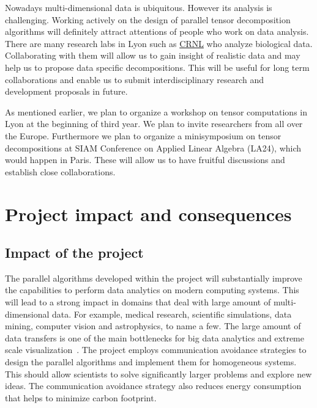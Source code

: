 \documentclass[a4paper,11pt]{article}
\begin{document}
	
	
	Nowadays multi-dimensional data is ubiquitous. However its analysis is challenging. Working actively on the design of parallel tensor decomposition algorithms will definitely attract attentions of people who work on data analysis. There are many research labs in Lyon such as \href{https://www.crnl.fr/}{CRNL} who analyze biological data. Collaborating with them will allow us to gain insight of realistic data and may help us to propose data specific decompositions. This will be useful for long term collaborations and enable us to submit interdisciplinary research and development proposals in future.
	
	As mentioned earlier, we plan to organize a workshop on tensor computations in Lyon at the beginning of third year. We plan to invite researchers from all over the Europe. Furthermore we plan to organize a minisymposium on tensor decompositions at SIAM Conference on Applied Linear Algebra (LA24), which would happen in Paris. These will allow us to have fruitful discussions and establish close collaborations.
	
	
	\section{Project impact and consequences}
	\label{sec:impact}
	\subsection*{Impact of the project}
	The parallel algorithms developed within the project will substantially improve the capabilities to perform data analytics on modern computing systems. This will lead to a strong impact in domains that deal with large amount of multi-dimensional data. For example, medical research, scientific simulations, data mining, computer vision and astrophysics, to name a few. The large amount of data transfers is one of the main bottlenecks for big data analytics and extreme scale visualization~\cite{DOE-Report-2014}. The project employs communication avoidance strategies to design the parallel algorithms and implement them for homogeneous systems. This should allow scientists to solve significantly larger problems and explore new ideas. The communication avoidance strategy also reduces energy consumption that helps to minimize carbon footprint.
	
\end{document}
